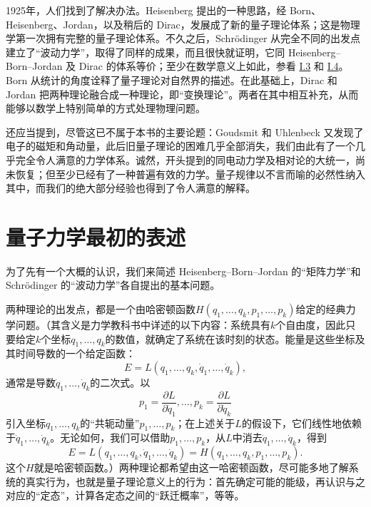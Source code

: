 \documentclass[fontsize=13pt,twoside,openany,headings=normal,parskip=false,bookmarkpackage=false,DIV=calc]{scrbook}
\begin{document}
1925年，人们找到了解决办法。Heisenberg 提出的一种思路，经 Born、Heisenberg、Jordan，以及稍后的 Dirac，发展成了新的\hypertarget{origpage-5}{}\label{origpage-5}量子理论体系；这是物理学第一次拥有完整的量子理论体系。不久之后，Schrödinger 从完全不同的出发点建立了“波动力学”，取得了同样的成果，而且很快就证明，它同 Heisenberg--Born--Jordan 及 Dirac 的体系等价；至少在数学意义上如此，参看 \hyperref[sec:I.3]{I.3} 和 \hyperref[sec:I.4]{I.4}。Born 从统计的角度诠释了量子理论对自然界的描述。在此基础上，Dirac 和 Jordan 把两种理论融合成一种理论，即“变换理论”。两者在其中相互补充，从而能够以数学上特别简单的方式处理物理问题。

还应当提到，尽管这已不属于本书的主要论题：Goudsmit 和 Uhlenbeck 又发现了电子的磁矩和角动量，此后旧量子理论的困难几乎全部消失，我们由此有了一个几乎完全令人满意的力学体系。诚然，开头提到的同电动力学及相对论的大统一，尚未恢复；但至少已经有了一种普遍有效的力学。量子规律以不言而喻的必然性纳入其中，而我们的绝大部分经验也得到了令人满意的解释。

\section{量子力学最初的表述}\label{sec:I.2}
为了先有一个大概的认识，我们来简述 Heisenberg--Born--Jordan 的“矩阵力学”和 Schrödinger 的“波动力学”各自提出的基本问题。

两种理论的出发点，都是一个由哈密顿函数$H(q_1,\allowbreak \ldots,\allowbreak q_k,\allowbreak p_1,\allowbreak \ldots,\allowbreak p_k)$给定的经典力学问题。（其含义是力学教科书中详述的以下内容：系统具有$k$个自由度，因此只要给定$k$个坐标$q_1,\allowbreak \ldots,\allowbreak q_k$的数值，就确定了系统在该时刻的状态。能量是这些坐标及其时间导数的一个给定函数：
\[
 E=L(q_1,\ldots,q_k,\dot q_1,\ldots,\dot q_k),
\]
通常是导数$\dot q_1,\allowbreak \ldots,\allowbreak \dot q_k$的二次式。以
\[
 p_1=\frac{\partial L}{\partial\dot q_1},\ldots,
 p_k=\frac{\partial L}{\partial\dot q_k}
\]
引入坐标$q_1,\allowbreak \ldots,\allowbreak q_k$的“共轭动量”$p_1,\allowbreak \ldots,\allowbreak p_k$；在上述关于$L$的假设下，它们线性地依赖于\hypertarget{origpage-6}{}\label{origpage-6}$\dot q_1,\allowbreak \ldots,\allowbreak \dot q_k$。无论如何，我们可以借助$p_1,\allowbreak \ldots,\allowbreak p_k$，从$L$中消去$\dot q_1,\allowbreak \ldots,\allowbreak \dot q_k$，得到
\[
 E=L(q_1,\ldots,q_k,\dot q_1,\ldots,\dot q_k)
  =H(q_1,\ldots,q_k,p_1,\ldots,p_k).
\]
这个$H$就是哈密顿函数。）两种理论都希望由这一哈密顿函数，尽可能多地了解系统的真实行为，也就是量子理论意义上的行为：首先确定可能的能级，再认识与之对应的“定态”，计算各定态之间的“跃迁概率”，等等。
\end{document}
